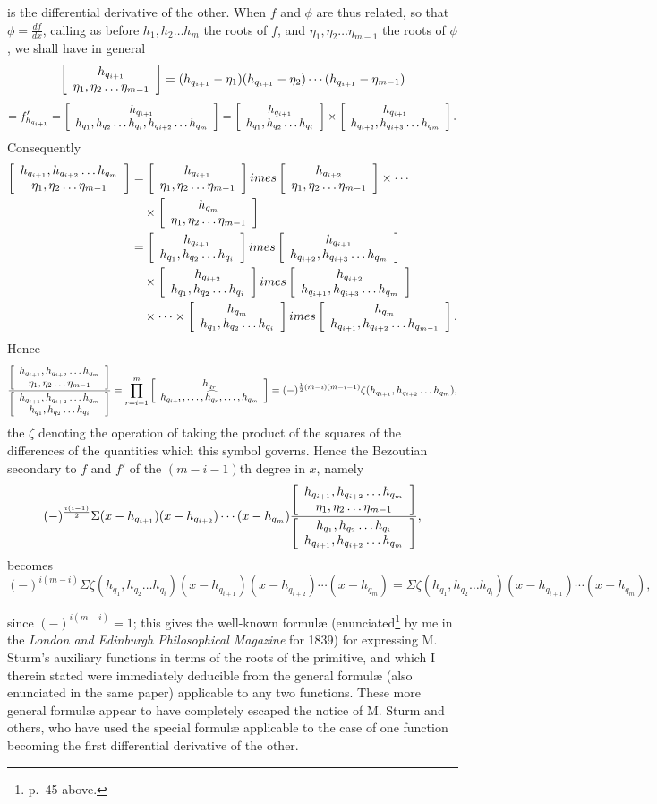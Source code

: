 \documentclass[11pt]{article}
\newcommand{\sourcepage}[1]{\marginpar{\scriptsize p.~#1}}
\begin{document}
\sourcepage{484}
is the differential derivative of the other. When $f$ and $\phi$ are thus related, so that $\phi=\frac{df}{dx}$, calling as before $h_1,h_2\ldots h_m$ the roots of $f$, and $\eta_1,\eta_2\ldots\eta_{m-1}$ the roots of $\phi$, we shall have in general
\[
\left[\begin{array}{c}h_{q_{i+1}}\\\eta_1,\eta_2\ldots\eta_{m-1}\end{array}\right]=(h_{q_{i+1}}-\eta_1)(h_{q_{i+1}}-\eta_2)\cdots(h_{q_{i+1}}-\eta_{m-1})
\]
\[
=f'_{h_{q_{i+1}}}=\left[\begin{array}{c}h_{q_{i+1}}\\h_{q_1},h_{q_2}\ldots h_{q_i},h_{q_{i+2}}\ldots h_{q_m}\end{array}\right]
=\left[\begin{array}{c}h_{q_{i+1}}\\h_{q_1},h_{q_2}\ldots h_{q_i}\end{array}\right]\times
\left[\begin{array}{c}h_{q_{i+1}}\\h_{q_{i+2}},h_{q_{i+3}}\ldots h_{q_m}\end{array}\right].
\]
Consequently
\[
\begin{aligned}
\left[\begin{array}{c}h_{q_{i+1}},h_{q_{i+2}}\ldots h_{q_m}\\\eta_1,\eta_2\ldots\eta_{m-1}\end{array}\right]
&=\left[\begin{array}{c}h_{q_{i+1}}\\\eta_1,\eta_2\ldots\eta_{m-1}\end{array}\right]	imes
\left[\begin{array}{c}h_{q_{i+2}}\\\eta_1,\eta_2\ldots\eta_{m-1}\end{array}\right]\times\cdots\\
&\quad\times\left[\begin{array}{c}h_{q_m}\\\eta_1,\eta_2\ldots\eta_{m-1}\end{array}\right]\\
&=\left[\begin{array}{c}h_{q_{i+1}}\\h_{q_1},h_{q_2}\ldots h_{q_i}\end{array}\right]	imes
\left[\begin{array}{c}h_{q_{i+1}}\\h_{q_{i+2}},h_{q_{i+3}}\ldots h_{q_m}\end{array}\right]\\
&\quad\times\left[\begin{array}{c}h_{q_{i+2}}\\h_{q_1},h_{q_2}\ldots h_{q_i}\end{array}\right]	imes
\left[\begin{array}{c}h_{q_{i+2}}\\h_{q_{i+1}},h_{q_{i+3}}\ldots h_{q_m}\end{array}\right]\\
&\quad\times\cdots\times
\left[\begin{array}{c}h_{q_m}\\h_{q_1},h_{q_2}\ldots h_{q_i}\end{array}\right]	imes
\left[\begin{array}{c}h_{q_m}\\h_{q_{i+1}},h_{q_{i+2}}\ldots h_{q_{m-1}}\end{array}\right].
\end{aligned}
\]
Hence
\[
\frac{\left[\begin{array}{c}h_{q_{i+1}},h_{q_{i+2}}\ldots h_{q_m}\\\eta_1,\eta_2\ldots\eta_{m-1}\end{array}\right]}
{\left[\begin{array}{c}h_{q_{i+1}},h_{q_{i+2}}\ldots h_{q_m}\\h_{q_1},h_{q_2}\ldots h_{q_i}\end{array}\right]}
=\prod_{r=i+1}^{m}\left[\begin{array}{c}h_{q_r}\\h_{q_{i+1}},\ldots,\widehat{h_{q_r}},\ldots,h_{q_m}\end{array}\right]
=(-)^{\frac12(m-i)(m-i-1)}\zeta(h_{q_{i+1}},h_{q_{i+2}}\ldots h_{q_m}),
\]
the $\zeta$ denoting the operation of taking the product of the squares of the differences of the quantities which this symbol governs. Hence the Bezoutian secondary to $f$ and $f'$ of the $(m-i-1)$th degree in $x$, namely
\[
(-)^{\frac{i(i-1)}2}\Sigma(x-h_{q_{i+1}})(x-h_{q_{i+2}})\cdots(x-h_{q_m})
\frac{\left[\begin{array}{c}h_{q_{i+1}},h_{q_{i+2}}\ldots h_{q_m}\\\eta_1,\eta_2\ldots\eta_{m-1}\end{array}\right]}
{\left[\begin{array}{c}h_{q_1},h_{q_2}\ldots h_{q_i}\\h_{q_{i+1}},h_{q_{i+2}}\ldots h_{q_m}\end{array}\right]},
\]
becomes
\[
(-)^{i(m-i)}\Sigma\zeta(h_{q_1},h_{q_2}\ldots h_{q_i})(x-h_{q_{i+1}})(x-h_{q_{i+2}})\cdots(x-h_{q_m})
=\Sigma\zeta(h_{q_1},h_{q_2}\ldots h_{q_i})(x-h_{q_{i+1}})\cdots(x-h_{q_m}),
\]

\sourcepage{485}
since $(-)^{i(m-i)}=1$; this gives the well-known formulæ (enunciated\footnote{p.~45 above.} by me in the \emph{London and Edinburgh Philosophical Magazine} for 1839) for expressing M. Sturm's auxiliary functions in terms of the roots of the primitive, and which I therein stated were immediately deducible from the general formulæ (also enunciated in the same paper) applicable to any two functions. These more general formulæ appear to have completely escaped the notice of M. Sturm and others, who have used the special formulæ applicable to the case of one function becoming the first differential derivative of the other.
\end{document}
